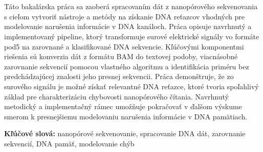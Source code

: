 \makeatletter
\renewenvironment{abstract}{
    \if@twocolumn
        \section*{\abstractname}%
    \else
        \normalfont
        \begin{flushleft} %
            {\bfseries \abstractname\par}%
        \end{flushleft}%
        \noindent\raggedright
    \fi
}
{
    \if@twocolumn\else\par\fi
}
\makeatother

\begin{abstract}

Táto bakalárska práca sa zaoberá spracovaním dát z nanopórového sekvenovania s cieľom 
vytvoriť nástroje a metódy na získanie DNA reťazcov vhodných pre modelovanie narušenia informácie 
v DNA kanáloch. Práca opisuje navrhnutý a implementovaný pipeline, ktorý transformuje surové elektrické 
signály vo formáte pod5 na zarovnané a klasifikované DNA sekvencie. Kľúčovými komponentmi riešenia 
sú konverzia dát z formátu BAM do textovej podoby, viacnásobné zarovnanie sekvencií pomocou vlastného 
algoritmu a identifikácia priméru bez predchádzajúcej znalosti 
jeho presnej sekvencii. Práca demonštruje, že zo surového signálu je možné získať relevantné DNA 
reťazce, ktoré tvoria spoľahlivý základ pre charakterizáciu chybovosti nanopórového čítania. Navrhnutý 
metodický a implementačný rámec umožňuje pokračovať v ďalšom výskume smerom k presnejšiemu modelovaniu 
narušenia informácie v DNA pamätiach.

\smallskip

\noindent\textbf{Kľúčové slová:} nanopórové sekvenovanie, spracovanie DNA dát, zarovnanie sekvencií, DNA pamäť, modelovanie chýb

\end{abstract}
\pagebreak
